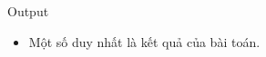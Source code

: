 Output  
\begin{itemize}
	\item     Một số duy nhất là kết quả của bài toán.   
\end{itemize}
\begin{itemize}
\end{itemize}